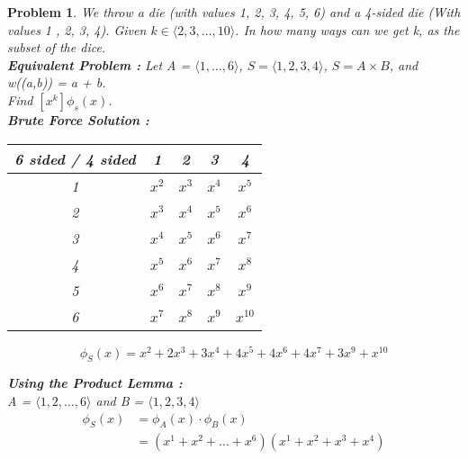 \documentclass{article}
\newtheorem{expx}[theorem]{Problem}
\begin{document}
\begin{expx}
We throw a die (with values 1, 2, 3, 4, 5, 6) and a 4-sided die (With values 1 , 2, 3, 4). Given \(k \in \langle 2, 3, \ldots, 10\rangle\). In how many ways can we get k, as the subset of the dice. \\ \newline 
\textbf{Equivalent Problem :} Let A = \(\langle 1, \ldots, 6 \rangle\), \(S = \langle 1, 2, 3, 4\rangle\), \(S = A \times B\), and w((a,b)) = a + b. \\
Find \([x^k] \phi_s(x)\).  \\ \newline
\textbf{Brute Force Solution : } \\ 
\begin{center}
\begin{tabular}{|c|c|c|c|c|}
\hline 
6 sided / 4 sided & 1 & 2 & 3 & 4 \\ 
\hline 
1 & $ x^2$ & $ x^3 $ & $x^4 $ & $ x^5 $  \\ 
\hline 
2 & $ x^3 $ & $x^4 $ & $ x^5 $  & $ x^6 $  \\ 
\hline 
3 & $x^4 $ & $ x^5 $  & $ x^6 $  & $x^7 $ \\ 
\hline 
4 & $ x^5 $  & $ x^6 $  & $x^7 $ & $x^8$ \\ 
\hline 
5 & $ x^6 $  & $x^7 $ & $x^8$ & $x^9$ \\ 
\hline 
6 & $x^7 $ & $x^8$ & $x^9$ & $ x^{10} $  \\ 
\hline 
\end{tabular} 
$$\phi_S(x) = x^2 + 2x^3 + 3x^4 + 4x^5 + 4x^6 + 4x^7 + 3x^9 + x^10$$
\end{center}
\textbf{Using the Product Lemma : } \\
A = \(\langle 1, 2, \ldots, 6 \rangle\) and 
B = \(\langle 1, 2, 3, 4 \rangle \) \\
\[ \begin{aligned}
\phi_S(x) & = \phi_A(x) \cdot \phi_B(x) \\
& = (x^1 + x^2 + \ldots + x^6 ) (x^1 + x^2 + x^3 + x^4) 
\end{aligned}\]
\end{expx} 
\end{document}
